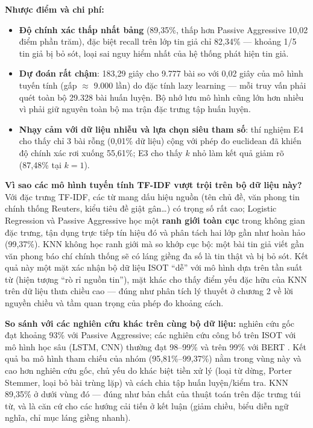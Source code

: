 \textbf{Nhược điểm và chi phí:}

\begin{itemize}
    \item \textbf{Độ chính xác thấp nhất bảng} (89,35\%, thấp hơn Passive Aggressive 10,02 điểm phần trăm), đặc biệt recall trên lớp tin giả chỉ 82,34\% --- khoảng 1/5 tin giả bị bỏ sót, loại sai nguy hiểm nhất của hệ thống phát hiện tin giả.
    \item \textbf{Dự đoán rất chậm}: 183,29 giây cho 9.777 bài so với 0,02 giây của mô hình tuyến tính (gấp $\approx$ 9.000 lần) do đặc tính lazy learning --- mỗi truy vấn phải quét toàn bộ 29.328 bài huấn luyện. Bộ nhớ lưu mô hình cũng lớn hơn nhiều vì phải giữ nguyên toàn bộ ma trận đặc trưng tập huấn luyện.
    \item \textbf{Nhạy cảm với dữ liệu nhiễu và lựa chọn siêu tham số}: thí nghiệm E4 cho thấy chỉ 3 bài rỗng (0,01\% dữ liệu) cộng với phép đo euclidean đã khiến độ chính xác rơi xuống 55,61\%; E3 cho thấy $k$ nhỏ làm kết quả giảm rõ (87,48\% tại $k = 1$).
\end{itemize}

\textbf{Vì sao các mô hình tuyến tính TF-IDF vượt trội trên bộ dữ liệu này?} Với đặc trưng TF-IDF, các từ mang dấu hiệu nguồn (tên chủ đề, văn phong tin chính thống Reuters, kiểu tiêu đề giật gân\ldots) có trọng số rất cao; Logistic Regression và Passive Aggressive học một \textbf{ranh giới toàn cục} trong không gian đặc trưng, tận dụng trực tiếp tín hiệu đó và phân tách hai lớp gần như hoàn hảo (99,37\%). KNN không học ranh giới mà so khớp cục bộ: một bài tin giả viết gần văn phong báo chí chính thống sẽ có láng giềng đa số là tin thật và bị bỏ sót. Kết quả này một mặt xác nhận bộ dữ liệu ISOT ``dễ'' với mô hình dựa trên tần suất từ (hiện tượng ``rò rỉ nguồn tin''), mặt khác cho thấy điểm yếu đặc hữu của KNN trên dữ liệu thưa chiều cao --- đúng như phân tích lý thuyết ở chương 2 về lời nguyền chiều và tầm quan trọng của phép đo khoảng cách.

\textbf{So sánh với các nghiên cứu khác trên cùng bộ dữ liệu:} nghiên cứu gốc \cite{ahmed2017} đạt khoảng 93\% với Passive Aggressive; các nghiên cứu công bố trên ISOT với mô hình học sâu (LSTM, CNN) thường đạt 98--99\% và trên 99\% với BERT \cite{bert}. Kết quả ba mô hình tham chiếu của nhóm (95,81\%--99,37\%) nằm trong vùng này và cao hơn nghiên cứu gốc, chủ yếu do khác biệt tiền xử lý (loại từ dừng, Porter Stemmer, loại bỏ bài trùng lặp) và cách chia tập huấn luyện/kiểm tra. KNN 89,35\% ở dưới vùng đó --- đúng như bản chất của thuật toán trên đặc trưng túi từ, và là căn cứ cho các hướng cải tiến ở kết luận (giảm chiều, biểu diễn ngữ nghĩa, chỉ mục láng giềng nhanh).

